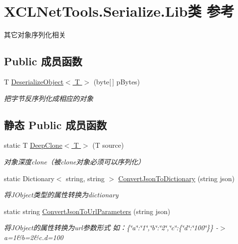 \hypertarget{class_x_c_l_net_tools_1_1_serialize_1_1_lib}{\section{X\-C\-L\-Net\-Tools.\-Serialize.\-Lib类 参考}
\label{class_x_c_l_net_tools_1_1_serialize_1_1_lib}
}


其它对象序列化相关  


\subsection*{Public 成员函数}
\begin{DoxyCompactItemize}
\item 
T \hyperlink{class_x_c_l_net_tools_1_1_serialize_1_1_lib_ae2d400cea76a1f11f5141deab7c6d2b1}{Deserialize\-Object$<$ T $>$} (byte\mbox{[}$\,$\mbox{]} p\-Bytes)
\begin{DoxyCompactList}\small\item\em 把字节反序列化成相应的对象 \end{DoxyCompactList}\end{DoxyCompactItemize}
\subsection*{静态 Public 成员函数}
\begin{DoxyCompactItemize}
\item 
static T \hyperlink{class_x_c_l_net_tools_1_1_serialize_1_1_lib_ad38f60aaa57643027af6ebc86ef7fe18}{Deep\-Clone$<$ T $>$} (T source)
\begin{DoxyCompactList}\small\item\em 对象深度clone（被clone对象必须可以序列化） \end{DoxyCompactList}\item 
static Dictionary$<$ string, string $>$ \hyperlink{class_x_c_l_net_tools_1_1_serialize_1_1_lib_a99dccfb2469a4a61f20742a002a3f0ae}{Convert\-Json\-To\-Dictionary} (string json)
\begin{DoxyCompactList}\small\item\em 将\-J\-Object类型的属性转换为dictionary \end{DoxyCompactList}\item 
static string \hyperlink{class_x_c_l_net_tools_1_1_serialize_1_1_lib_a0034741d0598296a34082889f2a2f83e}{Convert\-Json\-To\-Url\-Parameters} (string json)
\begin{DoxyCompactList}\small\item\em 将\-J\-Object的属性转换为url参数形式 如：\{\char`\"{}a\char`\"{}\-:\char`\"{}1\char`\"{},\char`\"{}b\char`\"{}\-:\char`\"{}2\char`\"{},\char`\"{}c\char`\"{}\-:\{\char`\"{}d\char`\"{}\-:\char`\"{}100\char`\"{}\}\} -\/$>$ a=1\&b=2\&c.\-d=100 \end{DoxyCompactList}\end{DoxyCompactItemize}


